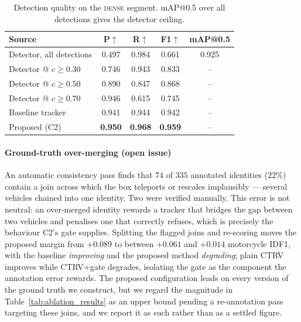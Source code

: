 \begin{table}[h]
  \centering
  \caption{Detection quality on the \textsc{dense} segment.
           mAP@0.5 over all detections gives the detector ceiling.}
  \label{tab:detection}
  \begin{tabular}{lcccc}
    \toprule
    Source & P$\uparrow$ & R$\uparrow$ & F1$\uparrow$ & mAP@0.5 \\
    \midrule
    Detector, all detections & 0.497 & 0.984 & 0.661 & 0.925 \\
    Detector @ $c \geq 0.30$ & 0.746 & 0.943 & 0.833 & -- \\
    Detector @ $c \geq 0.50$ & 0.890 & 0.847 & 0.868 & -- \\
    Detector @ $c \geq 0.70$ & 0.946 & 0.615 & 0.745 & -- \\
    \midrule
    Baseline tracker         & 0.941 & 0.944 & 0.942 & -- \\
    Proposed (C2)            & \textbf{0.950} & \textbf{0.968}
                             & \textbf{0.959} & -- \\
    \bottomrule
  \end{tabular}
\end{table}

\paragraph{Ground-truth over-merging (open issue)}
An automatic consistency pass finds that $74$ of $335$ annotated
identities ($22\%$) contain a join across which the box teleports or
rescales implausibly --- several vehicles chained into one identity.
Two were verified manually.
This error is not neutral: an over-merged identity rewards a tracker that
bridges the gap between two vehicles and penalises one that correctly
refuses, which is precisely the behaviour C2's gate supplies.
Splitting the flagged joins and re-scoring moves the proposed margin from
$+0.089$ to between $+0.061$ and $+0.014$ motorcycle IDF1, with the
baseline \emph{improving} and the proposed method \emph{degrading}; plain
CTRV improves while CTRV+gate degrades, isolating the gate as the
component the annotation error rewards.
The proposed configuration leads on every version of the ground truth we
construct, but we regard the magnitude in
Table~\ref{tab:ablation_results} as an upper bound pending a re-annotation
pass targeting these joins, and we report it as such rather than as a
settled figure.

